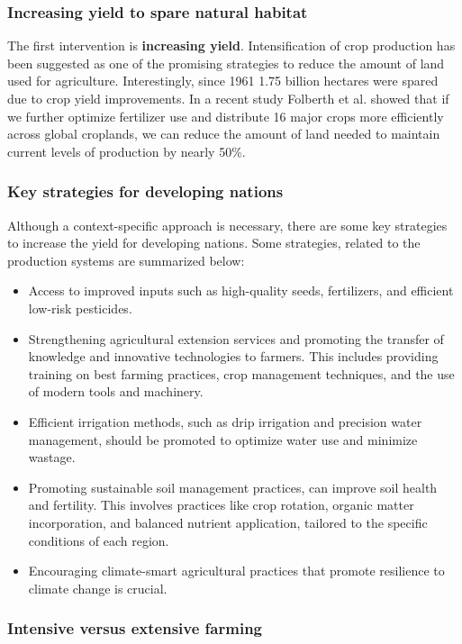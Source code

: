 \documentclass[../summary.tex]{subfiles}
\begin{document}
	\subsubsection{Increasing yield to spare natural habitat}
	
	The first intervention is \textbf{increasing yield}. Intensification of crop production has been suggested as one of the promising strategies to reduce the amount of land used for agriculture. Interestingly, since 1961 1.75 billion hectares were spared due to crop yield improvements. In a recent study Folberth et al. showed that if we further optimize fertilizer use and distribute 16 major crops more efficiently across global croplands, we can reduce the amount of land needed to maintain current levels of production by nearly 50\%.
	
	\subsubsection{Key strategies for developing nations}
	
	Although a context-specific approach is necessary, there are some key strategies to increase the yield for developing nations. Some strategies, related to the production systems are summarized below:
	
	\begin{itemize}
		\item Access to improved inputs such as high-quality seeds, fertilizers, and efficient low-risk pesticides.
		\item Strengthening agricultural extension services and promoting the transfer of knowledge and innovative technologies to farmers. This includes providing training on best farming practices, crop management techniques, and the use of modern tools and machinery.
		\item Efficient irrigation methods, such as drip irrigation and precision water management, should be promoted to optimize water use and minimize wastage.
		\item Promoting sustainable soil management practices, can improve soil health and fertility. This involves practices like crop rotation, organic matter incorporation, and balanced nutrient application, tailored to the specific conditions of each region.
		\item Encouraging climate-smart agricultural practices that promote resilience to climate change is crucial. 	
	\end{itemize}
	
	\subsubsection{Intensive versus extensive farming}
	
\end{document}
